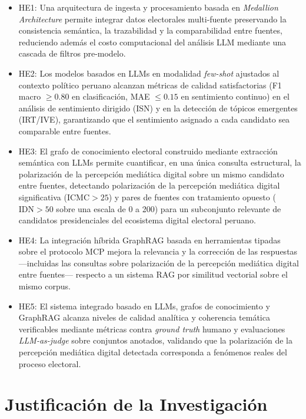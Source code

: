 \newcommand{\Hone}{Una arquitectura de ingesta y procesamiento basada en \textit{Medallion Architecture} permite integrar datos electorales multi-fuente preservando la consistencia semántica, la trazabilidad y la comparabilidad entre fuentes, reduciendo además el costo computacional del análisis LLM mediante una cascada de filtros pre-modelo.}
\newcommand{\Htwo}{Los modelos basados en LLMs en modalidad \textit{few-shot} ajustados al contexto político peruano alcanzan métricas de calidad satisfactorias (F1 macro $\geq 0.80$ en clasificación, MAE $\leq 0.15$ en sentimiento continuo) en el análisis de sentimiento dirigido (ISN) y en la detección de tópicos emergentes (IRT/IVE), garantizando que el sentimiento asignado a cada candidato sea comparable entre fuentes.}
\newcommand{\Hthree}{El grafo de conocimiento electoral construido mediante extracción semántica con LLMs permite cuantificar, en una única consulta estructural, la polarización de la percepción mediática digital sobre un mismo candidato entre fuentes, detectando polarización de la percepción mediática digital significativa ($\text{ICMC} > 25$) y pares de fuentes con tratamiento opuesto ($\text{IDN} > 50$ sobre una escala de 0 a 200) para un subconjunto relevante de candidatos presidenciales del ecosistema digital electoral peruano.}
\newcommand{\Hfour}{La integración híbrida GraphRAG basada en herramientas tipadas sobre el protocolo MCP mejora la relevancia y la corrección de las respuestas —incluidas las consultas sobre polarización de la percepción mediática digital entre fuentes— respecto a un sistema RAG por similitud vectorial sobre el mismo corpus.}
\newcommand{\Hfive}{El sistema integrado basado en LLMs, grafos de conocimiento y GraphRAG alcanza niveles de calidad analítica y coherencia temática verificables mediante métricas contra \textit{ground truth} humano y evaluaciones \textit{LLM-as-judge} sobre conjuntos anotados, validando que la polarización de la percepción mediática digital detectada corresponda a fenómenos reales del proceso electoral.}

\begin{itemize}
	\item HE1: \Hone
	\item HE2: \Htwo
	\item HE3: \Hthree
	\item HE4: \Hfour
	\item HE5: \Hfive
\end{itemize}


\section{Justificación de la Investigación}

